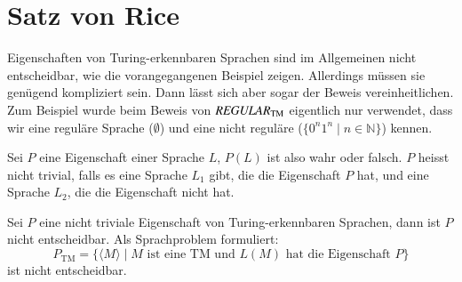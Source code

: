 %
%
%

\section{Satz von Rice}
Eigenschaften von Turing-erkennbaren Sprachen sind im Allgemeinen
nicht entscheidbar, wie die vorangegangenen Beispiel zeigen.
Allerdings müssen sie genü\-gend kompliziert sein.
Dann lässt
sich aber sogar der Beweis vereinheitlichen.
Zum Beispiel wurde
beim Beweis von $\text{\it REGULAR}_{\text{TM}}$ eigentlich
nur verwendet, dass wir eine reguläre Sprache ($\emptyset$) und
eine nicht reguläre ($\{0^n1^n\;|\;n\in\mathbb N\}$) kennen.

\begin{definition}
%
Sei $P$ eine Eigenschaft einer Sprache $L$, $P(L)$ ist also wahr oder
falsch.
$P$ heisst nicht trivial, falls es eine Sprache $L_1$ gibt,
die die Eigenschaft $P$ hat, und eine Sprache $L_2$, die die
Eigenschaft nicht hat.
\end{definition}

\begin{satz}[Rice]
%
\label{rice-theorem}
Sei $P$ eine nicht triviale Eigenschaft von Turing-erkennbaren Sprachen,
dann ist $P$ nicht entscheidbar.
Als Sprachproblem formuliert:
\[
P_{\text{TM}}=\{ \langle M\rangle\;|\;
\text{$M$ ist eine TM und $L(M)$ hat die Eigenschaft $P$}
\}
\]
ist nicht entscheidbar.
\end{satz}

